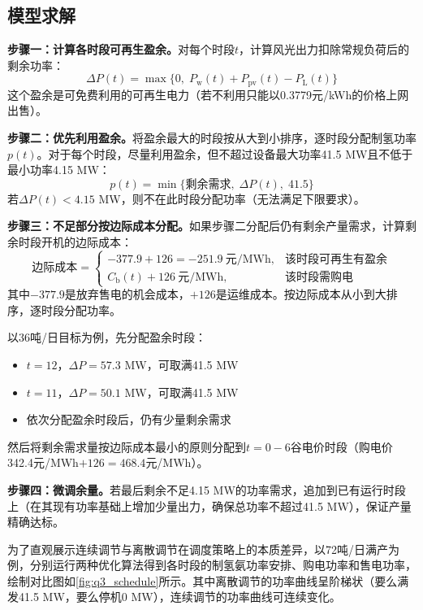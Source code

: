 \subsection{模型求解}

\textbf{步骤一：计算各时段可再生盈余。}对每个时段$t$，计算风光出力扣除常规负荷后的剩余功率：
\begin{equation*}
\Delta P(t) = \max\{0,\; P_{\mathrm{w}}(t) + P_{\mathrm{pv}}(t) - P_{\mathrm{L}}(t)\}
\end{equation*}
这个盈余是可免费利用的可再生电力（若不利用只能以0.3779元/kWh的价格上网出售）。

\textbf{步骤二：优先利用盈余。}将盈余最大的时段按从大到小排序，逐时段分配制氢功率$p(t)$。对于每个时段，尽量利用盈余，但不超过设备最大功率41.5 MW且不低于最小功率4.15 MW：
\begin{equation*}
p(t) = \min\{\text{剩余需求},\; \Delta P(t),\; 41.5\}
\end{equation*}
若$\Delta P(t) < 4.15$ MW，则不在此时段分配功率（无法满足下限要求）。

\textbf{步骤三：不足部分按边际成本分配。}如果步骤二分配后仍有剩余产量需求，计算剩余时段开机的边际成本：
\begin{equation*}
\text{边际成本} = 
\begin{cases}
-377.9 + 126 = -251.9\ \text{元/MWh}, & \text{该时段可再生有盈余}\\
C_{\mathrm{b}}(t) + 126\ \text{元/MWh}, & \text{该时段需购电}
\end{cases}
\end{equation*}
其中$-377.9$是放弃售电的机会成本，$+126$是运维成本。按边际成本从小到大排序，逐时段分配功率。

以36吨/日目标为例，先分配盈余时段：
\begin{itemize}
    \item $t=12$，$\Delta P=57.3$ MW，可取满41.5 MW
    \item $t=11$，$\Delta P=50.1$ MW，可取满41.5 MW
    \item 依次分配盈余时段后，仍有少量剩余需求
\end{itemize}
然后将剩余需求量按边际成本最小的原则分配到$t=0-6$谷电价时段（购电价342.4元/MWh$+126=468.4$元/MWh）。

\textbf{步骤四：微调余量。}若最后剩余不足4.15 MW的功率需求，追加到已有运行时段上（在其现有功率基础上增加少量出力，确保总功率不超过41.5 MW），保证产量精确达标。

为了直观展示连续调节与离散调节在调度策略上的本质差异，以72吨/日满产为例，分别运行两种优化算法得到各时段的制氢氨功率安排、购电功率和售电功率，绘制对比图如\cref{fig:q3_schedule}所示。其中离散调节的功率曲线呈阶梯状（要么满发41.5 MW，要么停机0 MW），连续调节的功率曲线可连续变化。

